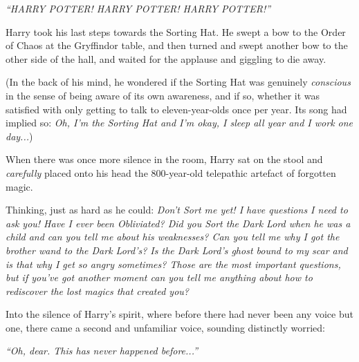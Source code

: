 \emph{``HARRY POTTER! HARRY POTTER! HARRY POTTER!''}

Harry took his last steps towards the Sorting Hat. He swept a bow to the
Order of Chaos at the Gryffindor table, and then turned and swept
another bow to the other side of the hall, and waited for the applause
and giggling to die away.

(In the back of his mind, he wondered if the Sorting Hat was genuinely
\emph{conscious} in the sense of being aware of its own awareness, and
if so, whether it was satisfied with only getting to talk to
eleven-year-olds once per year. Its song had implied so: \emph{Oh, I'm
the Sorting Hat and I'm okay, I sleep all year and I work one
day...})

When there was once more silence in the room, Harry sat on the stool and
\emph{carefully} placed onto his head the 800-year-old telepathic
artefact of forgotten magic.

Thinking, just as hard as he could: \emph{Don't Sort me yet! I have
questions I need to ask you! Have I ever been Obliviated? Did you Sort
the Dark Lord when he was a child and can you tell me about his
weaknesses? Can you tell me why I got the brother wand to the Dark
Lord's? Is the Dark Lord's ghost bound to my scar and is that why I get
so angry sometimes? Those are the most important questions, but if
you've got another moment can you tell me anything about how to
rediscover the lost magics that created you?}

Into the silence of Harry's spirit, where before there had never been
any voice but one, there came a second and unfamiliar voice, sounding
distinctly worried:

\emph{``Oh, dear. This has never happened before...''}
